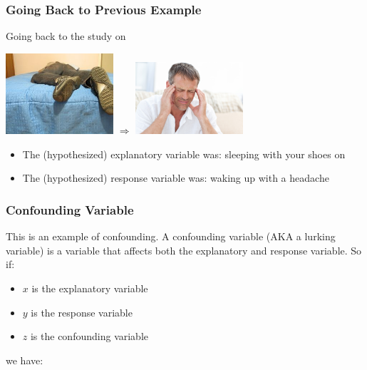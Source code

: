\documentclass[handout]{beamer}
\newcommand{\blue}[1]{\textcolor{blue2}{#1}}
\begin{document}
\begin{frame}
\frametitle{Going Back to Previous Example}

Going back to the study on 
\begin{center}
\includegraphics[width=0.3\textwidth]{figure/shoes.jpg}
\hspace{1cm}
$\Longrightarrow$
\hspace{1cm}
\includegraphics[width=0.3\textwidth]{figure/headache.jpg}
\end{center}

\begin{itemize}
\item The (hypothesized) explanatory variable was: sleeping with your shoes on
\item The (hypothesized) response variable was: waking up with a headache
\end{itemize}

\end{frame}


\begin{frame}
\frametitle{Confounding Variable}

This is an example of \blue{confounding}.  A confounding variable (AKA a \blue{lurking variable}) is a variable that affects both the explanatory and response variable.  So if:
\begin{itemize}
\pause\item $x$ is the explanatory variable
\pause\item $y$ is the response variable
\pause\item $z$ is the confounding variable
\end{itemize}
we have:
\vspace{3cm}

\end{frame}
\end{document}
